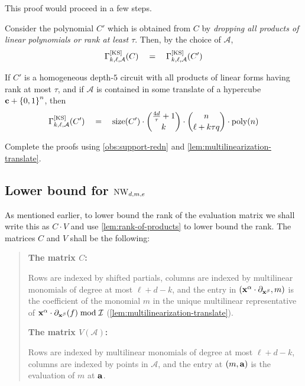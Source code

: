 This proof would proceed in a few steps. 

\begin{claim}
Consider the polynomial $C'$ which is obtained from $C$ by \emph{dropping all products of linear polynomials or rank at least $\tau$}. Then, by the choice of $\mathcal{A}$,
\[
\Gamma^{\mathrm{[KS]}}_{k,\ell,\mathcal{A}}(C) \quad = \quad\Gamma^{\mathrm{[KS]}}_{k,\ell,\mathcal{A}}(C')
\]
\end{claim}

\begin{claim}
  If $C'$ is a homogeneous depth-$5$ circuit with all products of linear forms having rank at most $\tau$, and if $\mathcal{A}$ is contained in some translate of a hypercube $\mathbf{c} + \left\{0,1\right\}^n$, then
\[
\Gamma^{\mathrm{[KS]}}_{k,\ell,\mathcal{A}}(C') \quad = \quad \mathrm{size}(C') \cdot \binom{\frac{4d}{\tau} + 1}{k} \cdot \binom{n}{\ell + k\tau q} \cdot \operatorname{poly}(n)
\]
\end{claim}

\begin{exercise}
Complete the proofs using \autoref{obs:support-redn} and \autoref{lem:multilinearization-translate}. 
\end{exercise}

\subsection{Lower bound for $\operatorname{\mathrm{NW}}_{d,m,e}$}

As mentioned earlier, to lower bound the rank of the evaluation matrix we shall write this as $C \cdot V$ and use \autoref{lem:rank-of-products} to lower bound the rank.
The matrices $C$ and $V$ shall be the following:
\begin{quote}
{\bf The matrix $C$:}

Rows are indexed by shifted partials, columns are indexed by multilinear monomials of degree at most $\ell + d - k$, and the entry in $(\mathbf{x}^{\alpha} \cdot \partial_{\mathbf{x}^{\beta}} , m)$ is the coefficient of the monomial $m$ in the unique multilinear representative of $\mathbf{x}^{\alpha} \cdot \partial_{\mathbf{x}^{\beta}}(f) \bmod{\mathcal{I}}$ (\autoref{lem:multilinearization-translate}). 

{\bf The matrix $V({\mathcal{A}})$:} 

Rows are indexed by multilinear monomials of degree at most $\ell + d - k$, columns are indexed by points in $\mathcal{A}$, and the entry at $(m,\mathbf{a})$ is the evaluation of $m$ at $\mathbf{a}$.
\end{quote}

